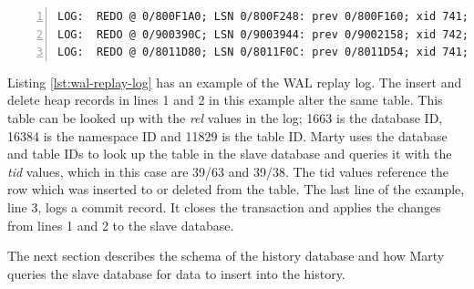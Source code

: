 \begin{lstlisting}[caption={WAL replay log example},label={lst:wal-replay-log},numbers=left,xleftmargin=2em]
LOG:  REDO @ 0/800F1A0; LSN 0/800F248: prev 0/800F160; xid 741; len 139: Heap - insert: rel 1663/16384/11829; tid 39/63
LOG:  REDO @ 0/900390C; LSN 0/9003944: prev 0/9002158; xid 742; len 26: Heap - delete: rel 1663/16384/11829; tid 39/38 KEYS_UPDATED
LOG:  REDO @ 0/8011D80; LSN 0/8011F0C: prev 0/8011D54; xid 741; len 368: Transaction - commit: 2014-03-06 23:36:33.937958+00
\end{lstlisting}

Listing \ref{lst:wal-replay-log} has an example of the WAL replay log.
The insert and delete heap records in lines 1 and 2 in this example alter the same table.
This table can be looked up with the \textit{rel} values in the log; 1663 is the database ID, 16384 is the namespace ID and 11829 is the table ID.
Marty uses the database and table IDs to look up the table in the slave database and queries it with the \textit{tid} values, which in this case are 39/63 and 39/38.
The tid values reference the row which was inserted to or deleted from the table.
The last line of the example, line 3, logs a commit record.
It closes the transaction and applies the changes from lines 1 and 2 to the slave database.

The next section describes the schema of the history database and how Marty queries the slave database for data to insert into the history.